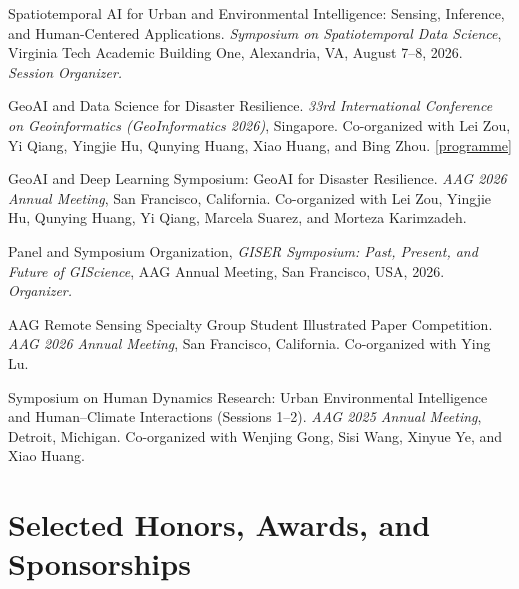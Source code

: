 \documentclass[10pt,letterpaper]{article}
\newenvironment{reflist}
  {\begin{list}{}{%
     \setlength{\leftmargin}{1.7em}\setlength{\itemindent}{-1.7em}%
     \setlength{\itemsep}{0.22em}\setlength{\parsep}{0pt}\setlength{\topsep}{0.25em}}}
  {\end{list}}
\begin{document}
\begin{reflist}
  \item[] [1] Spatiotemporal AI for Urban and Environmental Intelligence: Sensing, Inference, and Human-Centered Applications. \textit{Symposium on Spatiotemporal Data Science}, Virginia Tech Academic Building One, Alexandria, VA, August 7--8, 2026. \textit{Session Organizer.}
  \item[] [2] GeoAI and Data Science for Disaster Resilience. \textit{33rd International Conference on Geoinformatics (GeoInformatics 2026)}, Singapore. Co-organized with Lei Zou, Yi Qiang, Yingjie Hu, Qunying Huang, Xiao Huang, and Bing Zhou. \href{https://blog.nus.edu.sg/cpgis2026/programme/sessions/}{[programme]}
  \item[] [3] GeoAI and Deep Learning Symposium: GeoAI for Disaster Resilience. \textit{AAG 2026 Annual Meeting}, San Francisco, California. Co-organized with Lei Zou, Yingjie Hu, Qunying Huang, Yi Qiang, Marcela Suarez, and Morteza Karimzadeh.
  \item[] [4] Panel and Symposium Organization, \textit{GISER Symposium: Past, Present, and Future of GIScience}, AAG Annual Meeting, San Francisco, USA, 2026. \textit{Organizer.}
  \item[] [5] AAG Remote Sensing Specialty Group Student Illustrated Paper Competition. \textit{AAG 2026 Annual Meeting}, San Francisco, California. Co-organized with Ying Lu.
  \item[] [6] Symposium on Human Dynamics Research: Urban Environmental Intelligence and Human--Climate Interactions (Sessions 1--2). \textit{AAG 2025 Annual Meeting}, Detroit, Michigan. Co-organized with Wenjing Gong, Sisi Wang, Xinyue Ye, and Xiao Huang.
\end{reflist}

\section{Selected Honors, Awards, and Sponsorships}
\end{document}
